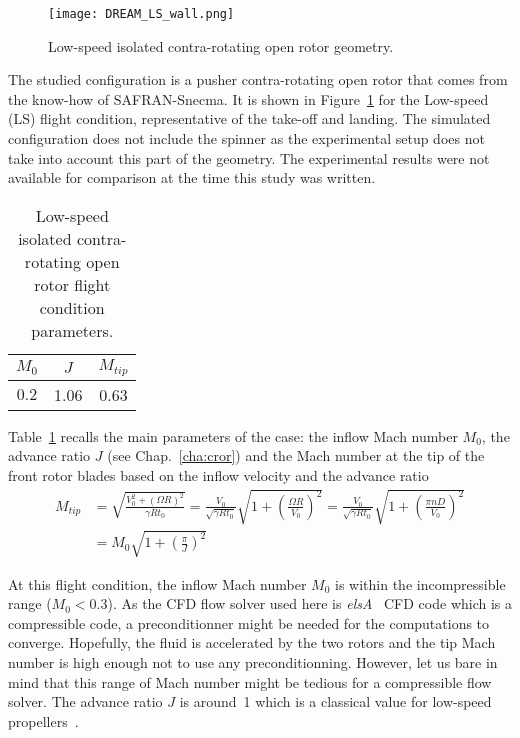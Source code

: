 

\begin{figure}[htp]
  \centering
  \texttt{[image: DREAM\_LS\_wall.png]}
  \caption{Low-speed isolated contra-rotating open rotor geometry.}
  \label{fig:dream_ls_wall}
\end{figure}

The studied configuration is a pusher contra-rotating open rotor
that comes from the know-how of SAFRAN-Snecma. 
It is shown in Figure~\ref{fig:dream_ls_wall} for the
Low-speed (LS) flight condition, representative of the take-off
and landing.
The simulated configuration does not include the spinner as the
experimental setup does not take into account this part of the geometry.
The experimental results were not available for comparison
at the time this study was written.

\begin{table}[htp]
   \centering
  \begin{tabular}{ccc}
    \toprule
    $M_0$ & $J$ & $M_{tip}$ \\
    \midrule
    $0.2$ & 1.06 & 0.63 \\
    \bottomrule
  \end{tabular}
  \caption{Low-speed isolated contra-rotating open rotor flight condition parameters.}
  \label{tab:dream_ls_flight_condition}
\end{table} 
Table~\ref{tab:dream_ls_flight_condition} recalls the main
parameters of the case: the inflow Mach number $M_0$,
the advance ratio $J$ (see Chap.~\ref{cha:cror})
and the Mach number at the tip of
the front rotor blades based on the inflow 
velocity and the advance ratio
\begin{equation}
  \begin{split}
    M_{tip} &= 
        \sqrt{\frac{V_0^2 + (\Omega R)^2}{\gamma R t_0}} =
        \frac{V_0}{\sqrt{\gamma R t_0}} 
          \sqrt{1 + \left(\frac{\Omega R}{V_0}\right)^2} =
        \frac{V_0}{\sqrt{\gamma R t_0}} 
          \sqrt{1 + \left(\frac{\pi n D}{
          V_0}\right)^2} \\
    &= M_0 \sqrt{1 + \left(\frac{\pi}{J} \right)^2}
  \end{split}
  \label{eq:m_tip}
\end{equation}

At this flight condition, the inflow Mach 
number $M_0$ is within the incompressible range
($M_0 < 0.3$). As the CFD flow solver used here is 
\textit{elsA}~\cite{Cambier2013} CFD code which is a compressible code, 
a preconditionner might be needed for the computations to converge. 
Hopefully, the fluid is accelerated by the two rotors
and the tip Mach number is high enough not to use any preconditionning.
However, let us bare in mind that this range of Mach number might
be tedious for a compressible flow solver.
The advance ratio $J$ is around~1 which is a classical value for
low-speed propellers~\cite{Bousquet2012}. 

